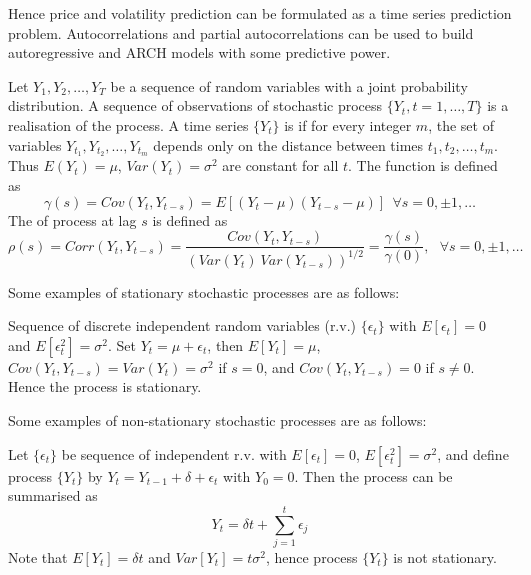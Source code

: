 Hence price and volatility prediction can be formulated as a time series prediction problem. Autocorrelations and partial autocorrelations can be used to build autoregressive and ARCH models with some predictive power.

Let $Y_1, Y_2, \ldots, Y_T$ be a sequence of random variables with a joint probability distribution. A sequence of observations of stochastic process $\{Y_t, t = 1, \ldots, T\}$ is a realisation of the process.
A time series $\{Y_t\}$ is  if for every integer $m$, the set of variables $Y_{t_1}, Y_{t_2}, \ldots, Y_{t_m}$ depends only on the distance between times $t_1, t_2, \ldots, t_m$. Thus $E(Y_t) = \mu$, $Var(Y_t) = \sigma^2$ are constant for all $t$.
The  function is defined as
\begin{equation*}
\gamma(s) = Cov(Y_t, Y_{t-s}) = E[(Y_t - \mu)(Y_{t-s} - \mu)] \ \ \forall s = 0, \pm 1, \ldots \nonumber
\end{equation*}
The  of process at lag $s$ is defined as
\begin{equation*}
\rho(s) = Corr(Y_t, Y_{t-s}) = \frac{Cov(Y_t, Y_{t-s})}{\left(Var(Y_t) \ Var(Y_{t-s}) \right)^{1/2}} = \frac{\gamma(s)}{\gamma(0)}, \ \ \ \forall s = 0, \pm 1, \ldots \nonumber
\end{equation*}

Some examples of stationary stochastic processes are as follows:

\begin{example}  Sequence of discrete independent random variables (r.v.) $\{\epsilon_t \}$ with $E[\epsilon_t] = 0$ and $E[\epsilon_t^2] = \sigma^2$. Set $Y_t = \mu + \epsilon_t$, then $E[Y_t] = \mu$, $Cov(Y_t, Y_{t-s}) = Var(Y_t) = \sigma^2$ if $s=0$, and $Cov(Y_t, Y_{t-s}) = 0$ if $s \neq 0$. Hence the process is stationary.
\end{example}

Some examples of non-stationary stochastic processes are as follows:

\begin{example}  Let $\{\epsilon_t \}$ be sequence of independent r.v. with  $E[\epsilon_t] = 0$, $E[\epsilon_t^2] = \sigma^2$, and define process $\{Y_t\}$ by $Y_t = Y_{t-1} + \delta + \epsilon_t$ with $Y_0 = 0$. Then the process can be summarised as
\begin{equation*}
Y_t = \delta t + \sum\limits_{j=1}^t \epsilon_j \nonumber
\end{equation*}
Note that $E[Y_t] = \delta t$ and $Var[Y_t] = t \sigma^2$, hence process $\{Y_t\}$ is not stationary.
\end{example}

